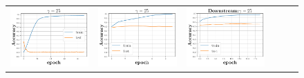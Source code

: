 \begin{figure}[h]
\begin{minipage}{0.99\columnwidth}
{\begin{tabular}{cccccc}
\includegraphics[scale=0.125]{figs/galu_25_bad.pdf}&
\includegraphics[scale=0.125]{figs/galu_25_bad_good.pdf}&
\includegraphics[scale=0.125]{figs/relu_25_good.pdf}&

\end{tabular}}
\end{minipage}
\end{figure}
